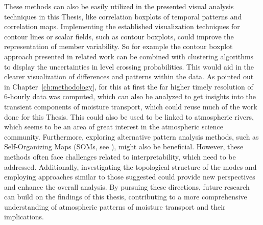 These methods can also be easily utilized in the presented visual analysis techniques in this Thesis, like correlation boxplots of temporal patterns and correlation maps.
Implementing the established visualization techniques for contour lines or scalar fields, such as contour boxplots, could improve the representation of member variability.
So for example the contour boxplot approach presented in related work can be combined with clustering algorithms to display the uncertainties in level crossing probabilities. 
This would aid in the clearer visualization of differences and patterns within the data.
As pointed out in Chapter~\ref{ch:methodology}, for this at first the far higher timely resolution of 6-hourly data was computed, which can also be analyzed to get insights into the transient components of moisture transport, which could reuse much of the work done for this Thesis.
This could also be used to be linked to atmospheric rivers, which seems to be an area of great interest in the atmospheric science community.
Furthermore, exploring alternative pattern analysis methods, such as Self-Organizing Maps (SOMs, see ), might also be beneficial. 
However, these methods often face challenges related to interpretability, which need to be addressed.
Additionally, investigating the topological structure of the modes and employing approaches similar to those suggested  could provide new perspectives and enhance the overall analysis.
By pursuing these directions, future research can build on the findings of this thesis, contributing to a more comprehensive understanding of atmospheric patterns of moisture transport and their implications.
